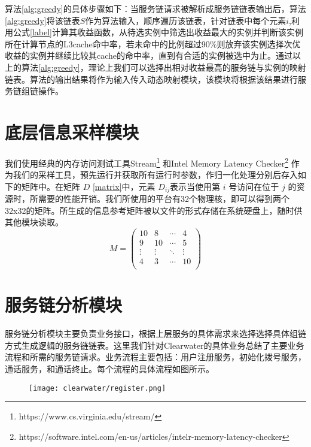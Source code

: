 算法\ref{alg:greedy}的具体步骤如下：当服务链请求被解析成服务链链表输出后，算法\ref{alg:greedy}将该链表$S$作为算法输入，顺序遍历该链表，针对链表中每个元素$i$,利用公式\ref{label}计算其收益函数，从待选实例中筛选出收益最大的实例并判断该实例所在计算节点的L3cache命中率，若未命中的比例超过90\%则放弃该实例选择次优收益的实例并继续比较其cache的命中率，直到有合适的实例被选中为止。通过以上的算法\ref{alg:greedy}，理论上我们可以选择出相对收益最高的服务链与实例的映射链表。算法的输出结果将作为输入传入动态映射模块，该模块将根据该结果进行服务链组链操作。


\section{底层信息采样模块}
我们使用经典的内存访问测试工具Stream\footnote{https://www.cs.virginia.edu/stream/} 和Intel Memory Latency Checker\footnote{https://software.intel.com/en-us/articles/intelr-memory-latency-checker} 作为我们的采样工具，预先运行并获取所有运行时参数，作归一化处理分别后存入如下的矩阵中。在矩阵 $D$ \ref{matrix}中，元素 $D_{ij}$表示当使用第 $i$ 号访问在位于 $j$ 的资源时，所需要的性能开销。我们所使用的平台有32个物理核，即可以得到两个32x32的矩阵。所生成的信息参考矩阵被以文件的形式存储在系统硬盘上，随时供其他模块读取。
$$
M =
\begin{pmatrix}
\label{matrix}
10      & 8      & \cdots & 4      \\
9      & 10      & \cdots & 5      \\
\vdots & \vdots & \ddots & \vdots \\
4      & 3      & \cdots & 10     \\
\end{pmatrix}
$$


\section{服务链分析模块}
服务链分析模块主要负责业务接口，根据上层服务的具体需求来选择选择具体组链方式生成逻辑的服务链链表。这里我们针对Clearwater的具体业务总结了主要业务流程和所需的服务链请求。业务流程主要包括：用户注册服务，初始化拨号服务，通话服务，和通话终止。每个流程的具体流程如图所示。
\begin{figure}[!htp]
	\centering
	\label{fig:flow_register}
	\texttt{[image: clearwater/register.png]}
\end{figure}

